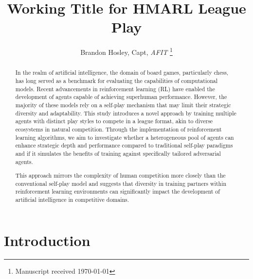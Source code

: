 \documentclass[journal]{IEEEtran}
\title{Working Title for HMARL League Play}
\author{Brandon Hosley, Capt, \textit{AFIT}%
	\thanks{Manuscript received \today%
}}
\begin{document}
	
	\maketitle
	
	
	\begin{abstract}
		
		In the realm of artificial intelligence, the domain of board games, particularly chess, 
		has long served as a benchmark for evaluating the capabilities of computational models. 
		Recent advancements in reinforcement learning (RL) have enabled the development of 
		agents capable of achieving superhuman performance. 
		However, the majority of these models rely on a self-play mechanism 
		that may limit their strategic diversity and adaptability. 
		This study introduces a novel approach by training multiple agents with distinct 
		play styles to compete in a league format, akin to diverse ecosystems in natural competition. 
		Through the implementation of reinforcement learning algorithms, 
		we aim to investigate whether a heterogeneous pool of agents can enhance strategic depth 
		and performance compared to traditional self-play paradigms and if it simulates the benefits of 
		training against specifically tailored adversarial agents. 
		\begin{comment}
		We developed several agents, each with a unique play style—aggressive, defensive, positional, and tactical—trained within a multi-agent reinforcement learning framework. 
		The performance of these agents was evaluated based on their win rates, Elo ratings, Glicko ratings, and their ability to adapt and counter a variety of opponent strategies. 
		Our results indicate that the inclusion of diverse play styles not only elevates the overall performance of individual agents in league play but also encourages the emergence of innovative strategies and adaptability.
		\end{comment}
		This approach mirrors the complexity of human competition more closely than the conventional self-play model and suggests that diversity in training partners within reinforcement learning environments can significantly impact the development of artificial intelligence in competitive domains.
		
	\end{abstract}
	
	\section{Introduction}
	\label{sec:introduction}
	
\end{document}
